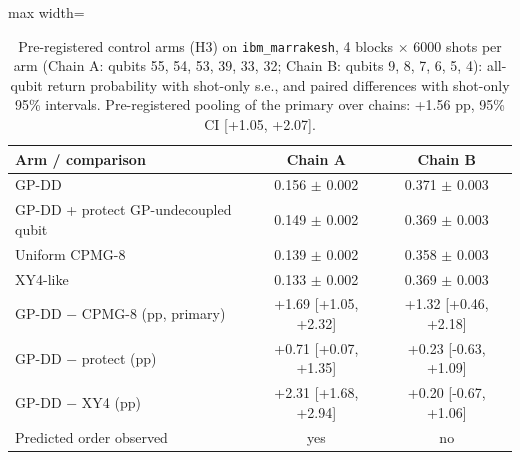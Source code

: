\begin{table}[t]
\centering
\caption{Pre-registered control arms (H3) on \texttt{ibm\_marrakesh}, 4 blocks $\times$ 6000 shots per arm (Chain A: qubits 55, 54, 53, 39, 33, 32; Chain B: qubits 9, 8, 7, 6, 5, 4): all-qubit return probability with shot-only s.e., and paired differences with shot-only 95\% intervals. Pre-registered pooling of the primary over chains: +1.56 pp, 95\% CI [+1.05, +2.07].}\label{tab:hw3}
\footnotesize
\begin{adjustbox}{max width=\columnwidth}
\begin{tabular}{lcc}
\toprule
Arm / comparison & Chain A & Chain B \\
\midrule
GP-DD & 0.156 $\pm$ 0.002 & 0.371 $\pm$ 0.003 \\
GP-DD + protect GP-undecoupled qubit & 0.149 $\pm$ 0.002 & 0.369 $\pm$ 0.003 \\
Uniform CPMG-8 & 0.139 $\pm$ 0.002 & 0.358 $\pm$ 0.003 \\
XY4-like & 0.133 $\pm$ 0.002 & 0.369 $\pm$ 0.003 \\
GP-DD $-$ CPMG-8 (pp, primary) & +1.69 [+1.05, +2.32] & +1.32 [+0.46, +2.18] \\
GP-DD $-$ protect (pp) & +0.71 [+0.07, +1.35] & +0.23 [-0.63, +1.09] \\
GP-DD $-$ XY4 (pp) & +2.31 [+1.68, +2.94] & +0.20 [-0.67, +1.06] \\
Predicted order observed & yes & no \\
\bottomrule
\end{tabular}
\end{adjustbox}
\end{table}
